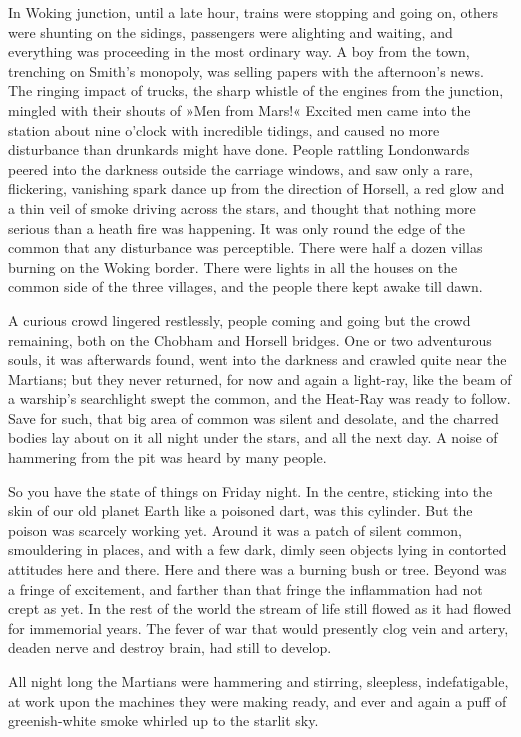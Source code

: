 In Woking junction, until a late hour, trains were stopping and going on, others were shunting on the sidings, passengers were alighting and waiting, and everything was proceeding in the most ordinary way. A boy from the town, trenching on Smith's monopoly, was selling papers with the afternoon's news. The ringing impact of trucks, the sharp whistle of the engines from the junction, mingled with their shouts of »Men from Mars!« Excited men came into the station about nine o'clock with incredible tidings, and caused no more disturbance than drunkards might have done. People rattling Londonwards peered into the darkness outside the carriage windows, and saw only a rare, flickering, vanishing spark dance up from the direction of Horsell, a red glow and a thin veil of smoke driving across the stars, and thought that nothing more serious than a heath fire was happening. It was only round the edge of the common that any disturbance was perceptible. There were half a dozen villas burning on the Woking border. There were lights in all the houses on the common side of the three villages, and the people there kept awake till dawn.

A curious crowd lingered restlessly, people coming and going but the crowd remaining, both on the Chobham and Horsell bridges. One or two adventurous souls, it was afterwards found, went into the darkness and crawled quite near the Martians; but they never returned, for now and again a light-ray, like the beam of a warship's searchlight swept the common, and the Heat-Ray was ready to follow. Save for such, that big area of common was silent and desolate, and the charred bodies lay about on it all night under the stars, and all the next day. A noise of hammering from the pit was heard by many people.

So you have the state of things on Friday night. In the centre, sticking into the skin of our old planet Earth like a poisoned dart, was this cylinder. But the poison was scarcely working yet. Around it was a patch of silent common, smouldering in places, and with a few dark, dimly seen objects lying in contorted attitudes here and there. Here and there was a burning bush or tree. Beyond was a fringe of excitement, and farther than that fringe the inflammation had not crept as yet. In the rest of the world the stream of life still flowed as it had flowed for immemorial years. The fever of war that would presently clog vein and artery, deaden nerve and destroy brain, had still to develop.

All night long the Martians were hammering and stirring, sleepless, indefatigable, at work upon the machines they were making ready, and ever and again a puff of greenish-white smoke whirled up to the starlit sky.



